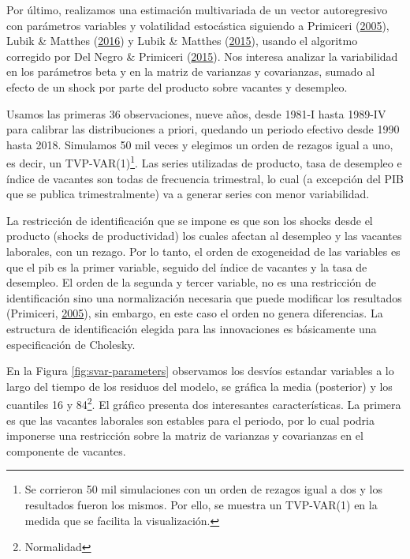 \documentclass[12pt,oneside]{reedthesis}
\begin{document}
Por último, realizamos una estimación multivariada de un vector autoregresivo con parámetros variables y volatilidad estocástica siguiendo a Primiceri (\protect\hyperlink{ref-Primiceri2005}{2005}), Lubik \& Matthes (\protect\hyperlink{ref-Lubik2016}{2016}) y Lubik \& Matthes (\protect\hyperlink{ref-Lubik2016b}{2015}), usando el algoritmo corregido por Del Negro \& Primiceri (\protect\hyperlink{ref-DelNegro2015}{2015}). Nos interesa analizar la variabilidad en los parámetros beta y en la matriz de varianzas y covarianzas, sumado al efecto de un shock por parte del producto sobre vacantes y desempleo.

Usamos las primeras 36 observaciones, nueve años, desde 1981-I hasta 1989-IV para calibrar las distribuciones a priori, quedando un periodo efectivo desde 1990 hasta 2018. Simulamos 50 mil veces y elegimos un orden de rezagos igual a uno, es decir, un TVP-VAR(1)\footnote{Se corrieron 50 mil simulaciones con un orden de rezagos igual a dos y los resultados fueron los mismos. Por ello, se muestra un TVP-VAR(1) en la medida que se facilita la visualización.}. Las series utilizadas de producto, tasa de desempleo e índice de vacantes son todas de frecuencia trimestral, lo cual (a excepción del PIB que se publica trimestralmente) va a generar series con menor variabilidad.

La restricción de identificación que se impone es que son los shocks desde el producto (shocks de productividad) los cuales afectan al desempleo y las vacantes laborales, con un rezago. Por lo tanto, el orden de exogeneidad de las variables es que el pib es la primer variable, seguido del índice de vacantes y la tasa de desempleo. El orden de la segunda y tercer variable, no es una restricción de identificación sino una normalización necesaria que puede modificar los resultados (Primiceri, \protect\hyperlink{ref-Primiceri2005}{2005}), sin embargo, en este caso el orden no genera diferencias. La estructura de identificación elegida para las innovaciones es básicamente una especificación de Cholesky.

En la Figura \ref{fig:svar-parameters} observamos los desvíos estandar variables a lo largo del tiempo de los residuos del modelo, se gráfica la media (posterior) y los cuantiles 16 y 84\footnote{Normalidad}. El gráfico presenta dos interesantes características. La primera es que las vacantes laborales son estables para el periodo, por lo cual podria imponerse una restricción sobre la matriz de varianzas y covarianzas en el componente de vacantes.
\end{document}
